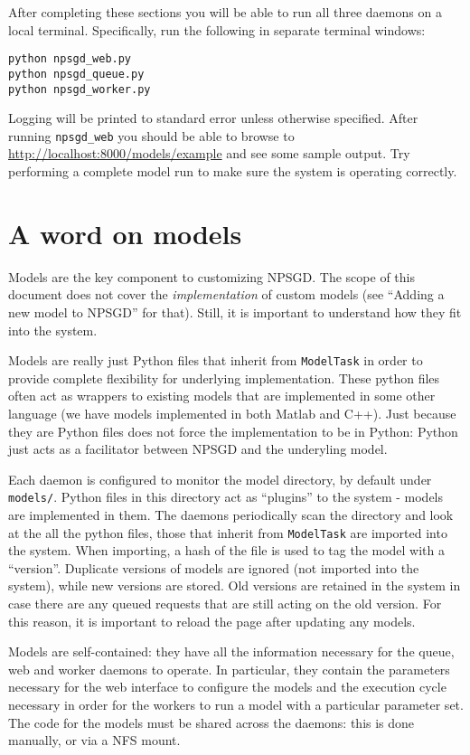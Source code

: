 \documentclass{article}
\newcommand{\mpath}[1]{\texttt{#1}}
\newcommand{\mclass}[1]{\texttt{#1}}
\begin{document}
After completing these sections you will be able to run all three daemons on a
local terminal. Specifically, run the following in separate terminal windows:
\begin{verbatim}
python npsgd_web.py
python npsgd_queue.py
python npsgd_worker.py
\end{verbatim}
Logging will be printed to standard error unless otherwise specified. After
running \texttt{npsgd\_web} you should be able to browse to
\url{http://localhost:8000/models/example} and see some sample output. Try
performing a complete model run to make sure the system is operating correctly.

\section{A word on models}
Models are the key component to customizing NPSGD. The scope of this document
does not cover the \textit{implementation} of custom models (see ``Adding a new
model to NPSGD'' for that). Still, it is important to understand how they fit
into the system.

Models are really just Python files that inherit from \mclass{ModelTask} in
order to provide complete flexibility for underlying implementation. These
python files often act as wrappers to existing models that are implemented in
some other language (we have models implemented in both Matlab and C++). Just
because they are Python files does not force the implementation to be in Python:
Python just acts as a facilitator between NPSGD and the underyling model. 

Each daemon is configured to monitor the model directory, by default under
\mpath{models/}. Python files in this directory act as ``plugins'' to the system
- models are implemented in them. The daemons periodically scan the directory
and look at the all the python files, those that inherit from \mclass{ModelTask}
are imported into the system. When importing, a hash of the file is used to tag
the model with a ``version''. Duplicate versions of models are ignored (not
imported into the system), while new versions are stored. Old versions are
retained in the system in case there are any queued requests that are still
acting on the old version. For this reason, it is important to reload the page
after updating any models.

Models are self-contained: they have all the information necessary for the
queue, web and worker daemons to operate. In particular, they contain the
parameters necessary for the web interface to configure the models and the
execution cycle necessary in order for the workers to run a model with a
particular parameter set. The code for the models must be shared
across the daemons: this is done manually, or via a NFS mount.
\end{document}
